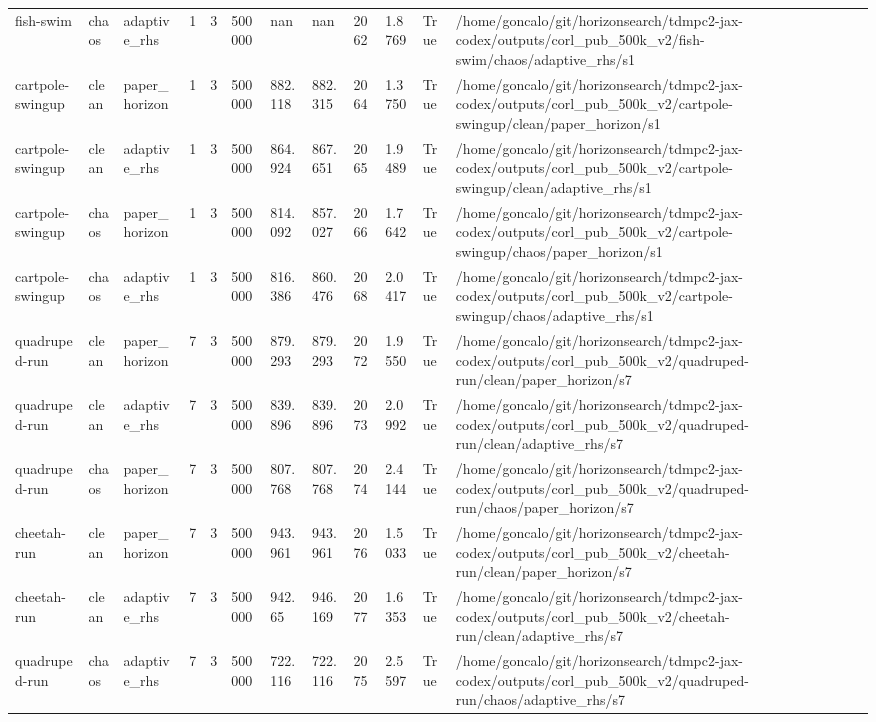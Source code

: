 \begin{tabular}{llllllllllll}
fish-swim & chaos & adaptive\_rhs & 1 & 3 & 500000 & nan & nan & 2062 & 1.8769 & True & /home/goncalo/git/horizonsearch/tdmpc2-jax-codex/outputs/corl\_pub\_500k\_v2/fish-swim/chaos/adaptive\_rhs/s1 \\
cartpole-swingup & clean & paper\_horizon & 1 & 3 & 500000 & 882.118 & 882.315 & 2064 & 1.3750 & True & /home/goncalo/git/horizonsearch/tdmpc2-jax-codex/outputs/corl\_pub\_500k\_v2/cartpole-swingup/clean/paper\_horizon/s1 \\
cartpole-swingup & clean & adaptive\_rhs & 1 & 3 & 500000 & 864.924 & 867.651 & 2065 & 1.9489 & True & /home/goncalo/git/horizonsearch/tdmpc2-jax-codex/outputs/corl\_pub\_500k\_v2/cartpole-swingup/clean/adaptive\_rhs/s1 \\
cartpole-swingup & chaos & paper\_horizon & 1 & 3 & 500000 & 814.092 & 857.027 & 2066 & 1.7642 & True & /home/goncalo/git/horizonsearch/tdmpc2-jax-codex/outputs/corl\_pub\_500k\_v2/cartpole-swingup/chaos/paper\_horizon/s1 \\
cartpole-swingup & chaos & adaptive\_rhs & 1 & 3 & 500000 & 816.386 & 860.476 & 2068 & 2.0417 & True & /home/goncalo/git/horizonsearch/tdmpc2-jax-codex/outputs/corl\_pub\_500k\_v2/cartpole-swingup/chaos/adaptive\_rhs/s1 \\
quadruped-run & clean & paper\_horizon & 7 & 3 & 500000 & 879.293 & 879.293 & 2072 & 1.9550 & True & /home/goncalo/git/horizonsearch/tdmpc2-jax-codex/outputs/corl\_pub\_500k\_v2/quadruped-run/clean/paper\_horizon/s7 \\
quadruped-run & clean & adaptive\_rhs & 7 & 3 & 500000 & 839.896 & 839.896 & 2073 & 2.0992 & True & /home/goncalo/git/horizonsearch/tdmpc2-jax-codex/outputs/corl\_pub\_500k\_v2/quadruped-run/clean/adaptive\_rhs/s7 \\
quadruped-run & chaos & paper\_horizon & 7 & 3 & 500000 & 807.768 & 807.768 & 2074 & 2.4144 & True & /home/goncalo/git/horizonsearch/tdmpc2-jax-codex/outputs/corl\_pub\_500k\_v2/quadruped-run/chaos/paper\_horizon/s7 \\
cheetah-run & clean & paper\_horizon & 7 & 3 & 500000 & 943.961 & 943.961 & 2076 & 1.5033 & True & /home/goncalo/git/horizonsearch/tdmpc2-jax-codex/outputs/corl\_pub\_500k\_v2/cheetah-run/clean/paper\_horizon/s7 \\
cheetah-run & clean & adaptive\_rhs & 7 & 3 & 500000 & 942.65 & 946.169 & 2077 & 1.6353 & True & /home/goncalo/git/horizonsearch/tdmpc2-jax-codex/outputs/corl\_pub\_500k\_v2/cheetah-run/clean/adaptive\_rhs/s7 \\
quadruped-run & chaos & adaptive\_rhs & 7 & 3 & 500000 & 722.116 & 722.116 & 2075 & 2.5597 & True & /home/goncalo/git/horizonsearch/tdmpc2-jax-codex/outputs/corl\_pub\_500k\_v2/quadruped-run/chaos/adaptive\_rhs/s7 \\

\end{tabular}
